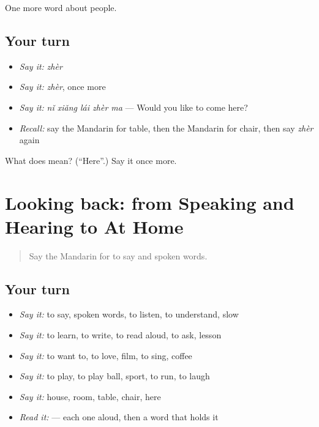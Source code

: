 \begin{grammarlens}[title={What you've built}]
One more word about people.
\end{grammarlens}

\subsection*{Your turn}
\begin{itemize}
\raggedright
  \item \emph{Say it:} \emph{zhèr}
  \item \emph{Say it:} \emph{zhèr}, once more
  \item \emph{Say it:} \emph{nǐ xiǎng lái zhèr ma} — Would you like to come here?
  \item \emph{Recall:} say the Mandarin for table, then the Mandarin for chair, then say \emph{zhèr} again
\end{itemize}

\begin{tcolorbox}[breakable,colback=teal!4,colframe=teal!35!black,title={Before you move on}]
What does  mean? (\textquotedblleft{}Here\textquotedblright{}.) Say it once more.
\end{tcolorbox}
\section[(dialogue)]{Looking back: from Speaking and Hearing to At Home}

\label{lesson:ZH-R57-review-53-57}



\begin{quote}
Say the Mandarin for to say and spoken words.
\end{quote}

\subsection*{Your turn}
\begin{itemize}
\raggedright
  \item \emph{Say it:} to say, spoken words, to listen, to understand, slow
  \item \emph{Say it:} to learn, to write, to read aloud, to ask, lesson
  \item \emph{Say it:} to want to, to love, film, to sing, coffee
  \item \emph{Say it:} to play, to play ball, sport, to run, to laugh
  \item \emph{Say it:} house, room, table, chair, here
  \item \emph{Read it:}    — each one aloud, then a word that holds it
\end{itemize}

